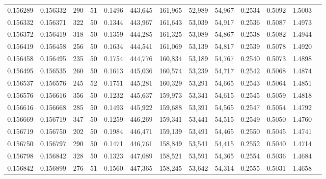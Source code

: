 \begin{tabular}{rrrrrrrrrrrrr}
0.156289 & 0.156332 &   290 &  51 &                                     0.1496 & 443,645 & 161,965 &  52,989 &  54,967 & 0.2534 & 0.5092 & 1.5003 \\
0.156332 & 0.156371 &   322 &  50 &                                     0.1344 & 443,967 & 161,643 &  53,039 &  54,917 & 0.2536 & 0.5087 & 1.4973 \\
0.156372 & 0.156419 &   318 &  50 &                                     0.1359 & 444,285 & 161,325 &  53,089 &  54,867 & 0.2538 & 0.5082 & 1.4944 \\
0.156419 & 0.156458 &   256 &  50 &                                     0.1634 & 444,541 & 161,069 &  53,139 &  54,817 & 0.2539 & 0.5078 & 1.4920 \\
0.156458 & 0.156495 &   235 &  50 &                                     0.1754 & 444,776 & 160,834 &  53,189 &  54,767 & 0.2540 & 0.5073 & 1.4898 \\
0.156495 & 0.156535 &   260 &  50 &                                     0.1613 & 445,036 & 160,574 &  53,239 &  54,717 & 0.2542 & 0.5068 & 1.4874 \\
0.156537 & 0.156576 &   245 &  52 &                                     0.1751 & 445,281 & 160,329 &  53,291 &  54,665 & 0.2543 & 0.5064 & 1.4851 \\
0.156576 & 0.156616 &   356 &  50 &                                     0.1232 & 445,637 & 159,973 &  53,341 &  54,615 & 0.2545 & 0.5059 & 1.4818 \\
0.156616 & 0.156668 &   285 &  50 &                                     0.1493 & 445,922 & 159,688 &  53,391 &  54,565 & 0.2547 & 0.5054 & 1.4792 \\
0.156669 & 0.156719 &   347 &  50 &                                     0.1259 & 446,269 & 159,341 &  53,441 &  54,515 & 0.2549 & 0.5050 & 1.4760 \\
0.156719 & 0.156750 &   202 &  50 &                                     0.1984 & 446,471 & 159,139 &  53,491 &  54,465 & 0.2550 & 0.5045 & 1.4741 \\
0.156750 & 0.156797 &   290 &  50 &                                     0.1471 & 446,761 & 158,849 &  53,541 &  54,415 & 0.2552 & 0.5040 & 1.4714 \\
0.156798 & 0.156842 &   328 &  50 &                                     0.1323 & 447,089 & 158,521 &  53,591 &  54,365 & 0.2554 & 0.5036 & 1.4684 \\
0.156842 & 0.156899 &   276 &  51 &                                     0.1560 & 447,365 & 158,245 &  53,642 &  54,314 & 0.2555 & 0.5031 & 1.4658 \\

\end{tabular}
